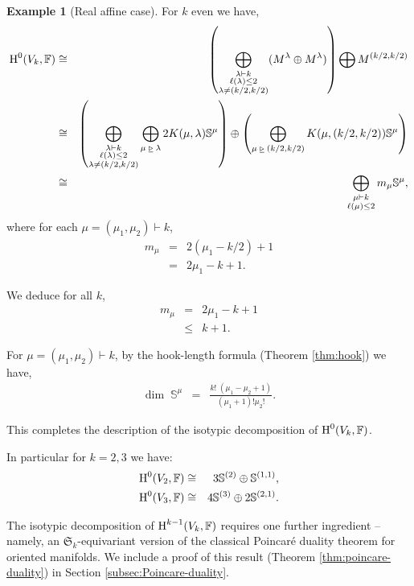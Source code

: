 \documentclass{amsart}
\theoremstyle{definition}
\newtheorem{example}{Example}
\theoremstyle{remark}
\numberwithin{equation}{section}
\begin{document}
\begin{example}[Real affine case]
For $k$ even we have,
\begin{eqnarray*}
{\mbox{\rm H}}^0(V_k,{\mathbb{F}}) &\cong & \left(\bigoplus_{\substack{\lambda \vdash k\\ \ell(\lambda) \leq 2 \\ \lambda \neq (k/2,k/2)}}  (M^\lambda \oplus M^\lambda) \right)  \bigoplus M^{(k/2,k/2)}  \\
& \cong & \left(
\bigoplus_{\substack{\lambda \vdash k \\ \ell(\lambda) \leq 2 \\ \lambda \neq (k/2,k/2)}} \bigoplus_{\mu {{\;\underline{\triangleright}\;}} \lambda} 2 K(\mu,\lambda)  \mathbb{S}^\mu 
\right) \oplus
 \left(
 \bigoplus_{\mu {{\;\underline{\triangleright}\;}} (k/2,k/2)} K(\mu,(k/2,k/2))\mathbb{S}^\mu
 \right)\\
& \cong & \bigoplus_{\substack{\mu \vdash k \\ \ell(\mu) \leq 2}} m_\mu \mathbb{S}^\mu,
\end{eqnarray*}
where for each $\mu = (\mu_1,\mu_2)  \vdash k$,  
\begin{eqnarray}
m_\mu &=& 2(\mu_1 - {k/2})+1  \nonumber\\
	     &=& 2\mu_1 -k +1. \label{eqn:odd}
\end{eqnarray}

We deduce for all $k$, 
\begin{eqnarray}
m_\mu &=& 2\mu_1 -k +1 \label{eqn:even-and-odd} \\
            &\leq & k+1. \nonumber
\end{eqnarray}

For $\mu = (\mu_1,\mu_2) \vdash k$, by the hook-length formula (Theorem \ref{thm:hook}) 
we have,
\begin{eqnarray}
\label{eqn:hook-length}
\dim \; \mathbb{S}^\mu &=& \frac{k! \; (\mu_1 - \mu_2+1)}{(\mu_1+1)!\mu_2!}.
\end{eqnarray}

This completes the description of the isotypic decomposition of ${\mbox{\rm H}}^0(V_k,{\mathbb{F}})$. 

In particular for $k=2,3$ we have:
\begin{eqnarray*}
{\mbox{\rm H}}^0(V_2,{\mathbb{F}}) &\cong &  3\mathbb{S}^{(2)} \oplus \mathbb{S}^{(1,1)}, \\
{\mbox{\rm H}}^0(V_3,{\mathbb{F}}) &\cong &  4\mathbb{S}^{(3)} \oplus 2\mathbb{S}^{(2,1)}.
\end{eqnarray*}

The isotypic decomposition of ${\mbox{\rm H}}^{k-1}(V_k,{\mathbb{F}})$ requires one further ingredient -- namely, an
$\mathfrak{S}_k$-equivariant version of the classical Poincar\'e duality theorem for oriented manifolds. We include 
a proof of this result (Theorem \ref{thm:poincare-duality}) in  Section \ref{subsec:Poincare-duality}.


\end{example}
\end{document}
